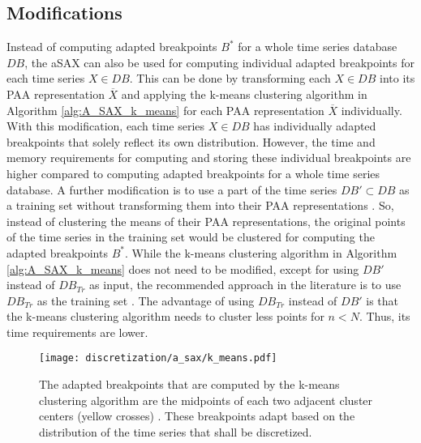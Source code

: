 \subsection*{Modifications} \label{a_sax_modfications}
Instead of computing adapted breakpoints $B^*$ for a whole time series database $DB$, the \ac{aSAX} can also be used for computing individual adapted breakpoints for each time series $X \in DB$. This can be done by transforming each $X \in DB$ into its \ac{PAA} representation $\overline{X}$ and applying the k-means clustering algorithm in Algorithm \ref{alg:A_SAX_k_means} for each \ac{PAA} representation $\overline{X}$ individually. With this modification, each time series $X \in DB$ has individually adapted breakpoints that solely reflect its own distribution. However, the time and memory requirements for computing and storing these individual breakpoints are higher compared to computing adapted breakpoints for a whole time series database. \newline
A further modification is to use a part of the time series $DB' \subset DB$ as a training set without transforming them into their \ac{PAA} representations \cite{A_SAX}. So, instead of clustering the means of their \ac{PAA} representations, the original points of the time series in the training set would be clustered for computing the adapted breakpoints $B^*$. While the k-means clustering algorithm in Algorithm \ref{alg:A_SAX_k_means} does not need to be modified, except for using $DB'$ instead of $DB_{Tr}$ as input, the recommended approach in the literature is to use $DB_{Tr}$ as the training set \cite{A_SAX}. The advantage of using $DB_{Tr}$ instead of $DB'$ is that the k-means clustering algorithm needs to cluster less points for $n < N$. Thus, its time requirements are lower.
\begin{figure}[htb]
\centering
\texttt{[image: discretization/a\_sax/k\_means.pdf]}
\caption[Adaptive Symbolic Aggregate Approximation - Adapted Breakpoints]{The adapted breakpoints that are computed by the k-means clustering algorithm are the midpoints of each two adjacent cluster centers (yellow crosses) \cite{A_SAX}. These breakpoints adapt based on the distribution of the time series that shall be discretized.}
\label{fig:k_means}
\end{figure}
